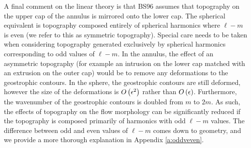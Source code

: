 


A final comment on the linear theory is that BS96  assumes that topography  on the upper cap of the annulus is mirrored onto the lower cap. The spherical equivalent is topography composed entirely of spherical harmonics where $\ell - m$ is even (we refer to this as symmetric topography). 
Special care needs to be taken when considering topography generated exclusively by spherical harmonics corresponding to odd values of $\ell - m$. 
In the annulus, the effect of an asymmetric topography (for example an intrusion on the lower cap matched with an extrusion on the outer cap) would be to remove any deformations to the geostrophic contours. 
In the sphere, the geostrophic contours are still deformed, however the size of the deformations is $O\left ( \epsilon^{2}\right ) $ rather than $O\left ( \epsilon\right ) $. 
Furthermore, the wavenumber of the geostrophic contours is doubled from $m$ to $2m.$ 
As such, the effects of topography on the flow morphology can be significantly reduced if the topography is composed primarily of harmonics with odd  $\ell - m$ values.
The difference between odd and even values of $\ell - m$ comes down to geometry, and we provide a more thorough explanation in Appendix \ref{a:oddveven}.  


